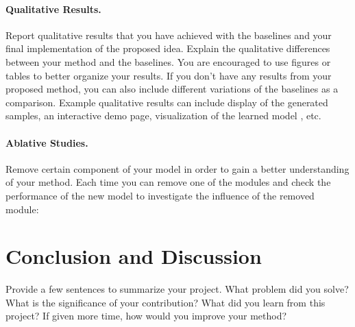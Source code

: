 \documentclass{article}
\newcommand{\new}[1]{{\color{red} #1}}
\begin{document}
\paragraph{Qualitative Results.}
Report  qualitative results that you have achieved with the baselines and your \new{final} implementation of the proposed idea. Explain the qualitative differences between your method and the baselines. You are encouraged to use figures or tables to better organize  your results. If you don't have any results from your proposed method, you can also include different variations of the baselines as a comparison. \new{Example qualitative results can include display of the generated samples, an interactive demo page, visualization of the learned model , etc. }

\new{\paragraph{Ablative Studies.}
Remove certain component of your  model  in order to gain a better understanding of your method.  Each time you can  remove one of the modules and check the performance of the new model to investigate the influence of the removed module:
}

\new{\section{Conclusion and Discussion}
Provide a few sentences to summarize your project. What problem did you solve? What is the significance of your contribution?  What did you learn from this project? If given more time, how would you improve your method?
}



\end{document}
